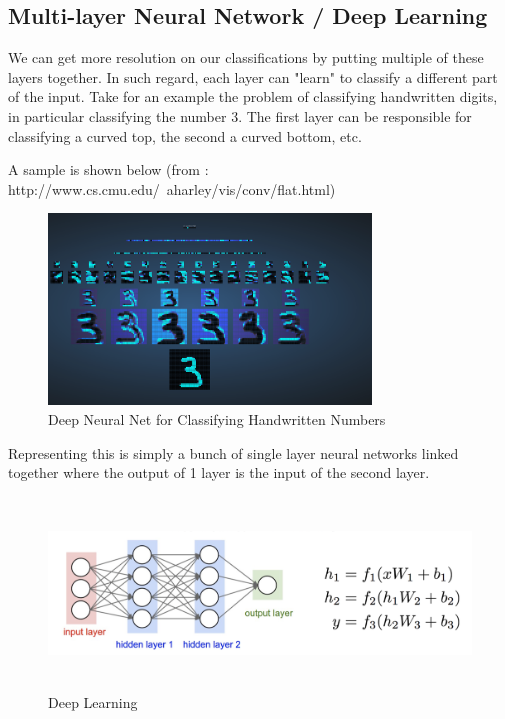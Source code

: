 \documentclass[twoside]{article}
\begin{document}
\subsection{Multi-layer Neural Network / Deep Learning}

We can get more resolution on our classifications by putting multiple of these layers together. In such regard, each layer can "learn" to classify a different part of the input. Take for an example the problem of classifying handwritten digits, in particular classifying the number 3. The first layer can be responsible for classifying a curved top, the second a curved bottom, etc. 

A sample is shown below (from : http://www.cs.cmu.edu/~aharley/vis/conv/flat.html)

\begin{figure}[!htb]
\centering
\includegraphics[height = 2in]{pics/deep_neural_net.png}
\caption{Deep Neural Net for Classifying Handwritten Numbers\cite{}}
\label{fig:Single layer neural net}
\end{figure}

Representing this is simply a bunch of single layer neural networks linked together where the output of 1 layer is the input of the second layer.

\begin{figure}[!htb]
\centering
\includegraphics[height = 2in]{pics/deep_learning.png}
\caption{Deep Learning\cite{}}
\label{fig:Deep Learning}
\end{figure}
\end{document}
